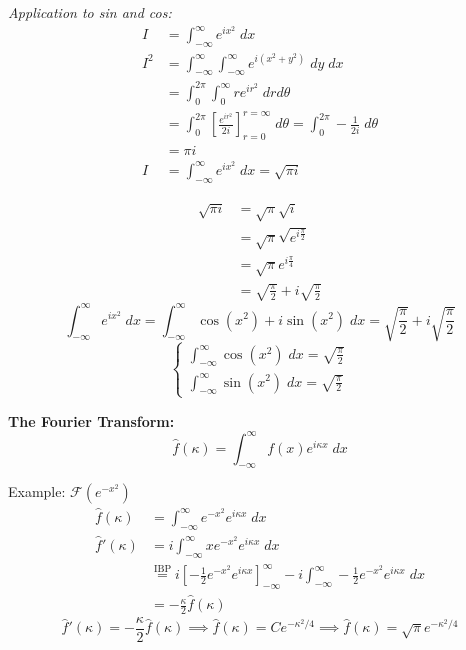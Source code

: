\documentclass[12pt]{article}
\renewcommand{\hat}[1]{\widehat{#1}}
\newcommand{\F}[1]{\mathcal{F}(#1)}
\begin{document}
\emph{Application to sin and cos:}
\begin{align*}
    I &= \int_{-\infty}^{\infty} e^{ix^2}\; dx\\
    I^2 &= \int_{-\infty}^{\infty} \int_{-\infty}^{\infty} e^{i(x^2 + y^2)}\; dy\; dx\\
    &= \int_0^{2\pi} \int_0^\infty re^{ir^2}\; dr d\theta\\
    &= \int_0^{2\pi} \left[\frac{e^{ir^2}}{2i}\right]_{r=0}^{r=\infty} \; d\theta = \int_0^{2\pi} -\frac{1}{2i} \; d\theta\\
    &= \pi i\\
    I &= \int_{-\infty}^{\infty} e^{ix^2}\; dx = \sqrt{\pi i}
\end{align*}

\begin{align*}
    \sqrt{\pi i} &= \sqrt{\pi} \sqrt{i}\\
    &= \sqrt{\pi} \sqrt{e^{i \frac{\pi}{2}}}\\
    &= \sqrt{\pi} e^{i \frac{\pi}{4}}\\
    &= \sqrt{\frac{\pi}{2}} + i\sqrt{\frac{\pi}{2}}
\end{align*}
\[\int_{-\infty}^{\infty} e^{ix^2}\; dx = \int_{-\infty}^{\infty} \cos(x^2) + i\sin(x^2) \; dx = \sqrt{\frac{\pi}{2}} + i\sqrt{\frac{\pi}{2}}\]
\[\begin{cases}
    \int_{-\infty}^{\infty} \cos(x^2)\; dx = \sqrt{\frac{\pi}{2}}\\
    \int_{-\infty}^{\infty} \sin(x^2)\; dx = \sqrt{\frac{\pi}{2}}
\end{cases}\]

\textbf{The Fourier Transform:}
\[\hat{f}(\kappa) = \int_{-\infty}^{\infty} f(x)e^{i\kappa x}\; dx\]

Example: $\F{e^{-x^2}}$
\begin{align*}
    \hat{f}(\kappa) &= \int_{-\infty}^{\infty} e^{-x^2}e^{i\kappa x}\; dx\\
    \hat{f}'(\kappa) &= i\int_{-\infty}^{\infty} xe^{-x^2} e^{i\kappa x}\; dx\\
    &\overset{\text{IBP}}{=} i\left[-\frac{1}{2}e^{-x^2}e^{i\kappa x}\right]_{-\infty}^\infty - i \int_{-\infty}^{\infty} -\frac{1}{2} e^{-x^2}e^{i\kappa x}\; dx\\
    &= -\frac{\kappa}{2} \hat{f}(\kappa)
\end{align*}
\[\hat{f}'(\kappa)= -\frac{\kappa}{2} \hat{f}(\kappa) \implies \hat{f}(\kappa) =Ce^{-\kappa^2/4} \implies \hat{f}(\kappa) = \sqrt{\pi}e^{-\kappa^2/4}\]
\end{document}

